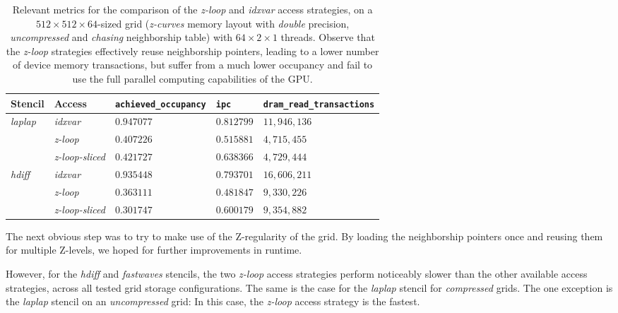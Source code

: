 \begin{table}
	\begin{center}
    \begin{tabular}{l l p{2.5cm} p{2.5cm} p{2.5cm}}
        \hline
        \textbf{Stencil} & \textbf{Access} & \textbf{\texttt{achieved\_\allowbreak occupancy}} & \textbf{\texttt{ipc}} & \textbf{\texttt{dram\_\allowbreak read\_\allowbreak transactions}} \\
        \hline
        \hline
        \emph{laplap} & \emph{idxvar} & $0.947077$ & $0.812799$ & $11,946,136$ \\
        & \emph{z-loop} & $0.407226$ & $0.515881$ & $4,715,455$ \\
        & \emph{z-loop-sliced} & $0.421727$ & $0.638366$ & $4,729,444$ \\
        \hline
        \emph{hdiff} & \emph{idxvar} & $0.935448$ & $0.793701$ & $16,606,211$ \\
        & \emph{z-loop} & $0.363111$ & $0.481847$ & $9,330,226$ \\
        & \emph{z-loop-sliced} & $0.301747$ & $0.600179$ & $9,354,882$ \\
        \hline
    \end{tabular}
	\end{center}
    \caption{\label{tab:access-z-loop} Relevant metrics for the comparison of the \emph{z-loop} and \emph{idxvar} access strategies, on a $512\times 512\times 64$-sized grid (\emph{z-curves} memory layout with \emph{double} precision, \emph{uncompressed} and \emph{chasing} neighborship table) with $64\times 2\times 1$ threads. Observe that the \emph{z-loop} strategies effectively reuse neighborship pointers, leading to a lower number of device memory transactions, but suffer from a much lower occupancy and fail to use the full parallel computing capabilities of the GPU.}
\end{table}

The next obvious step was to try to make use of the Z-regularity of the grid. By loading the neighborship pointers once and reusing them for multiple Z-levels, we hoped for further improvements in runtime. 

However, for the \emph{hdiff} and \emph{fastwaves} stencils, the two \emph{z-loop} access strategies perform noticeably slower than the other available access strategies, across all tested grid storage configurations. The same is the case for the \emph{laplap} stencil for \emph{compressed} grids. The one exception is the \emph{laplap} stencil on an \emph{uncompressed} grid: In this case, the \emph{z-loop} access strategy is the fastest.

